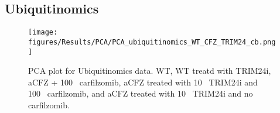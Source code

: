 \subsection{Ubiquitinomics}\label{subsec:omics-glygly}

\begin{figure}[htb]
\centering
\texttt{[image: figures/Results/PCA/PCA\_ubiquitinomics\_WT\_CFZ\_TRIM24\_cb.png]}
\caption[Ubiquitinomics PCA]{PCA plot for Ubiquitinomics data.
WT, WT treatd with TRIM24i, aCFZ + 100\si{\nano\Molar} carfilzomib, aCFZ treated with 10\si{\mu\Molar} TRIM24i and 100\si{\nano\Molar} carfilzomib, and aCFZ treated with 10\si{\micro\Molar} TRIM24i and no carfilzomib.}
\label{fig:glygly_PCA}
\end{figure}


